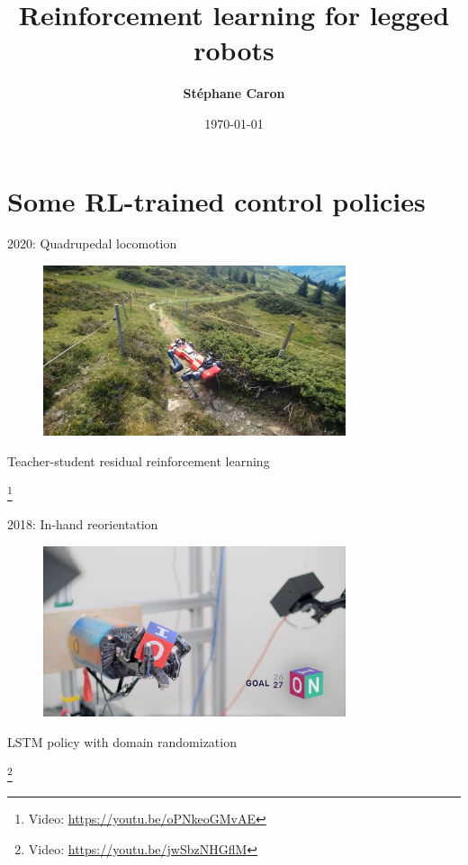 \documentclass[10pt, aspectratio=1610]{beamer}
\title{
    Reinforcement learning for legged robots
}
\author{\textbf{St\'ephane Caron}}
\date{\today}
\institute{Inria, \'{E}cole normale sup\'{e}rieure}
\newcommand\blfootnote[1]{%
  \begingroup
  \renewcommand\thefootnote{}%
  \footnote{#1}%
  \addtocounter{footnote}{-1}%
  \endgroup
}
\begin{document}
\maketitle


\section*{Some RL-trained control policies}

\begin{frame}{2020: Quadrupedal locomotion}
    \vspace{1.5em}
    \begin{figure}
        \includegraphics[height=5cm]{figures/hike-with-anymal.jpg}
    \end{figure}
    \begin{center}
        Teacher-student residual reinforcement learning~\cite{lee2020}
    \end{center}
    \blfootnote{Video: \url{https://youtu.be/oPNkeoGMvAE}}
\end{frame}

\begin{frame}{2018: In-hand reorientation}
    \vspace{1.5em}
    \begin{figure}
        \includegraphics[height=5cm]{figures/in-hand-reorientation.jpg}
    \end{figure}
    \begin{center}
        LSTM policy with domain randomization~\cite{andrychowicz2020learning}
    \end{center}
    \blfootnote{Video: \url{https://youtu.be/jwSbzNHGflM}}
\end{frame}
\end{document}
